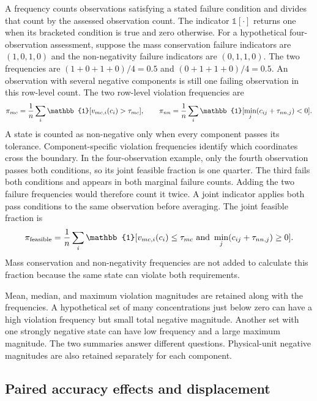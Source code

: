 A frequency counts observations satisfying a stated failure condition and divides that count by the assessed observation count. The indicator $\mathbb{1}[\cdot]$ returns one when its bracketed condition is true and zero otherwise. For a hypothetical four-observation assessment, suppose the mass conservation failure indicators are $(1,0,1,0)$ and the non-negativity failure indicators are $(0,1,1,0)$. The two frequencies are $(1+0+1+0)/4=0.5$ and $(0+1+1+0)/4=0.5$. An observation with several negative components is still one failing observation in this row-level count. The two row-level violation frequencies are
\begin{equation}
\equationname{Mass conservation and non-negativity violation frequencies}
\pi_{mc}=
\frac{1}{n}\sum_i\mathbb{1}[v_{mc,i}(c_i)>\tau_{mc}],\qquad
\pi_{nn}=
\frac{1}{n}\sum_i\mathbb{1}[\min_j(c_{ij}+\tau_{nn,j})<0].
\label{eq:projection_violation_rates}
\end{equation}
A state is counted as non-negative only when every component passes its tolerance. Component-specific violation frequencies identify which coordinates cross the boundary. In the four-observation example, only the fourth observation passes both conditions, so its joint feasible fraction is one quarter. The third fails both conditions and appears in both marginal failure counts. Adding the two failure frequencies would therefore count it twice. A joint indicator applies both pass conditions to the same observation before averaging. The joint feasible fraction is
\begin{equation}
\equationname{Jointly feasible fraction of assessed component states}
\pi_{\mathrm{feasible}}=
\frac{1}{n}\sum_i\mathbb{1}
[v_{mc,i}(c_i)\leq\tau_{mc}\ \text{and}\ 
\min_j(c_{ij}+\tau_{nn,j})\geq0].
\label{eq:projection_feasible_fraction}
\end{equation}
Mass conservation and non-negativity frequencies are not added to calculate this fraction because the same state can violate both requirements.

Mean, median, and maximum violation magnitudes are retained along with the frequencies. A hypothetical set of many concentrations just below zero can have a high violation frequency but small total negative magnitude. Another set with one strongly negative state can have low frequency and a large maximum magnitude. The two summaries answer different questions. Physical-unit negative magnitudes are also retained separately for each component.

\subsection{Paired accuracy effects and displacement}

